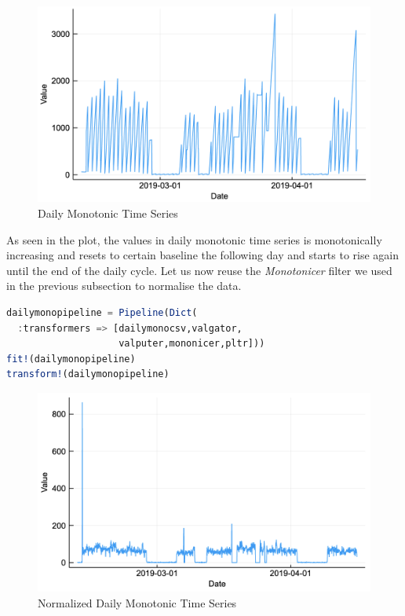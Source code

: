 \documentclass{juliacon}
\begin{document}
\begin{figure}[htbp]
   \centering
   \includegraphics[width=\columnwidth]{dailymono.png} %
   \caption{Daily Monotonic Time Series}
   \label{fig:dailymono}
\end{figure}

As seen in the plot, the values in daily monotonic time series is monotonically increasing and resets to certain baseline the following day and starts to rise again until the end of the daily cycle.
\vskip 2pt
Let us now reuse the \emph{Monotonicer} filter we used in the previous subsection to normalise the data.

\begin{lstlisting}[language = Julia]
dailymonopipeline = Pipeline(Dict(
  :transformers => [dailymonocsv,valgator,
                    valputer,mononicer,pltr]))
fit!(dailymonopipeline)
transform!(dailymonopipeline)
\end{lstlisting}

\begin{figure}[htbp]
   \centering
   \includegraphics[width=\columnwidth]{normdailymono.png}  %
   \caption{Normalized Daily Monotonic Time Series}
   \label{fig:ndailymono}
\end{figure}
\end{document}
